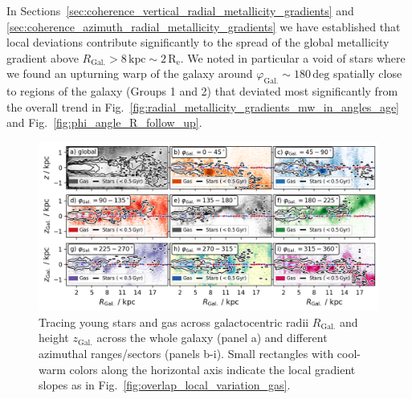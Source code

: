 \documentclass[fleqn,usenatbib]{mnras}
\begin{document}
In Sections~\ref{sec:coherence_vertical_radial_metallicity_gradients} and \ref{sec:coherence_azimuth_radial_metallicity_gradients} we have established that local deviations contribute significantly to the spread of the global metallicity gradient above $R_\mathrm{Gal.} > 8\,\mathrm{kpc} \sim 2\,\mathrm{R_e}$. We noted in particular a void of stars where we found an upturning warp of the galaxy around $\varphi_\mathrm{Gal.} \sim 180\,\mathrm{deg}$ spatially close to regions of the galaxy (Groups 1 and 2) that deviated most significantly from the overall trend in Fig.~\ref{fig:radial_metallicity_gradients_mw_in_angles_age} and Fig.~\ref{fig:phi_angle_R_follow_up}.

\begin{figure}
    \centering
    \includegraphics[width=\columnwidth]{figures/tracing_young_stars_and_gas_in_angles.png}
    \caption{Tracing young stars and gas across galactocentric radii $R_\mathrm{Gal.}$ and height $z_\mathrm{Gal.}$ across the whole galaxy (panel a) and different azimuthal ranges/sectors (panels b-i). Small rectangles with cool-warm colors along the horizontal axis indicate the local gradient slopes as in Fig.~\ref{fig:overlap_local_variation_gas}.}
    \label{fig:tracing_young_stars_and_gas_in_angles}
\end{figure}
\end{document}
